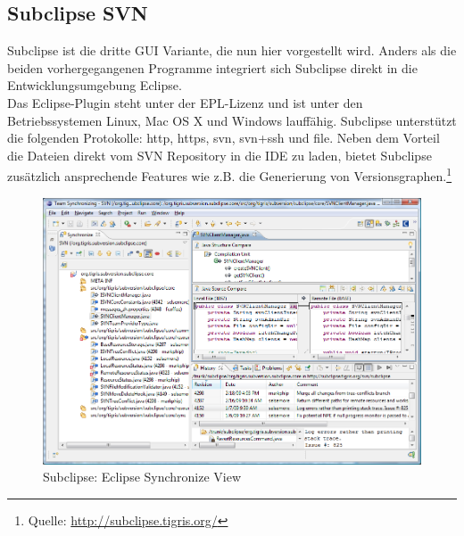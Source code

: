 \subsection{Subclipse SVN}
Subclipse ist die dritte GUI Variante, die nun hier vorgestellt wird. Anders als die beiden vorhergegangenen Programme integriert sich Subclipse direkt in die Entwicklungsumgebung Eclipse.\\
Das Eclipse-Plugin steht unter der EPL-Lizenz und ist unter den Betriebssystemen Linux, Mac OS X und Windows lauffähig. Subclipse unterstützt die folgenden Protokolle: http, https, svn, svn+ssh und file. Neben dem Vorteil die Dateien direkt vom SVN Repository in die IDE zu laden, bietet Subclipse zusätzlich ansprechende Features wie z.B. die Generierung von Versionsgraphen.\footnote{Quelle: \url{http://subclipse.tigris.org/}}
\begin{figure}[!htb]
        \centering
        \includegraphics[width=.8\textwidth]{5_subclipse1.png}
        \caption{Subclipse: Eclipse Synchronize View}
        \label{fig:subclipse1}
\end{figure}
